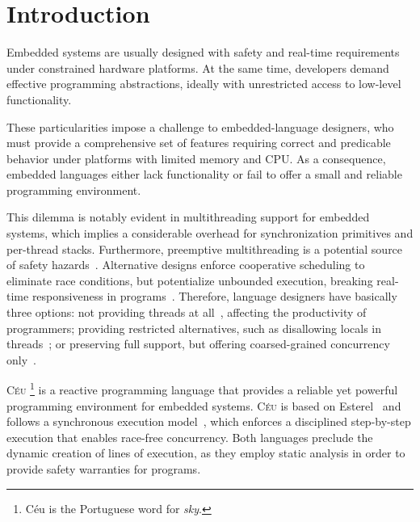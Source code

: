 \documentclass[preprint]{sigplanconf}
\newcommand{\CEU}{\textsc{C\'{e}u}\xspace}
\newcommand{\1}{\;}
\newcommand{\2}{\;\;}
\newcommand{\3}{\;\;\;}
\newcommand{\5}{\;\;\;\;\;}
\begin{document}



\section{Introduction}

Embedded systems are usually designed with safety and real-time requirements 
under constrained hardware platforms.
At the same time, developers demand effective programming abstractions, ideally 
with unrestricted access to low-level functionality.

These particularities impose a challenge to embedded-language designers, who 
must provide a comprehensive set of features requiring correct and predicable 
behavior under platforms with limited memory and CPU.
As a consequence, embedded languages either lack functionality or fail to offer 
a small and reliable programming environment.

This dilemma is notably evident in multithreading support for embedded systems, 
which implies a considerable overhead for synchronization primitives and 
per-thread stacks.
Furthermore, preemptive multithreading is a potential source of safety 
hazards~\cite{sync_async.threadsproblems}.
Alternative designs enforce cooperative scheduling to eliminate race 
conditions, but potentialize unbounded execution, breaking real-time 
responsiveness in programs~\cite{wsn.comparison}.
Therefore, language designers have basically three options:
not providing threads at all~\cite{wsn.nesc}, affecting the productivity of 
programmers;
providing restricted alternatives, such as disallowing locals in 
threads~\cite{wsn.protothreads};
or preserving full support, but offering coarsed-grained concurrency 
only~\cite{wsn.mantisos}.

\CEU%
\footnote{C\'eu is the Portuguese word for \emph{sky}.}
is a reactive programming language that provides a reliable yet powerful 
programming environment for embedded systems.
\CEU is based on Esterel~\cite{esterel.ieee91} and follows a synchronous 
execution model~\cite{rp.twelve}, which enforces a disciplined step-by-step 
execution that enables race-free concurrency.
Both languages preclude the dynamic creation of lines of execution, as they 
employ static analysis in order to provide safety warranties for programs.
\end{document}
